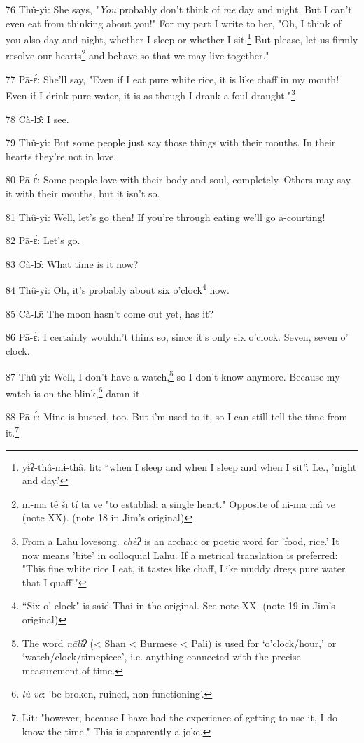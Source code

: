 76 Thû-yì: She says, "\textit{You} probably don't think of \textit{me}
day and night. But I can't even eat from thinking about you!" For my part
I write to her, "Oh, I think of you also day and night, whether I sleep
or whether I sit.\footnote{yɨ̀ʔ-thâ-mɨ-thâ, lit: ``when I sleep and when I sleep and when I sit''. I.e., 'night and day.'} But please, let us firmly resolve our hearts\footnote{ni-ma tê šī tí tā ve "to establish a single heart." Opposite of ni-ma mâ ve (note XX). (note 18 in Jim's original)} and behave
so that we may live together."

77 Pā-ɛ́: She'll say, "Even if I eat pure white rice, it is like chaff
in my mouth! Even if I drink pure water, it is as though I drank a foul draught."\footnote{From a Lahu lovesong. \textit{chèʔ} is an archaic or poetic word for 'food, rice.' It now means 'bite' in colloquial Lahu. If a metrical translation is preferred:  "This fine white rice I eat, it tastes like chaff,  Like muddy dregs pure water that I quaff!"}

78 Cà-lɔ̂: I see.

79 Thû-yì: But some people just say those things with their mouths. In their
hearts they're not in love.

80 Pā-ɛ́: Some people love with their body and soul, completely. Others may
say it with their mouths, but it isn't so.

81 Thû-yì: Well, let's go then! If you're through eating we'll go a-courting!

82 Pā-ɛ́: Let's go.

83 Cà-lɔ̂: What time is it now?

84 Thû-yì: Oh, it's probably about\textit{ }six o'clock\footnote{``Six o' clock" is said Thai in the original. See note XX. (note 19 in Jim's original)} now.

85 Cà-lɔ̂: The moon hasn't come out yet, has it?

86 Pā-ɛ́: I certainly wouldn't think so, since it's only six o'clock. Seven,
seven o' clock.

87 Thû-yì: Well, I don't have a watch,\footnote{The word \textit{nālìʔ }(< Shan < Burmese < Pali) is used for `o'clock/hour,' or `watch/clock/timepiece', i.e. anything connected with the precise measurement of time.} so I don't know anymore. Because my
watch is on the blink,\footnote{\textit{lù ve}: 'be broken, ruined, non-functioning'.} damn it.

88 Pā-ɛ́: Mine is busted, too. But i'm used to it, so I can still tell the
time from it.\footnote{Lit: "however, because I have had the experience of getting to use it, I do know the time." This is apparently a joke.}

